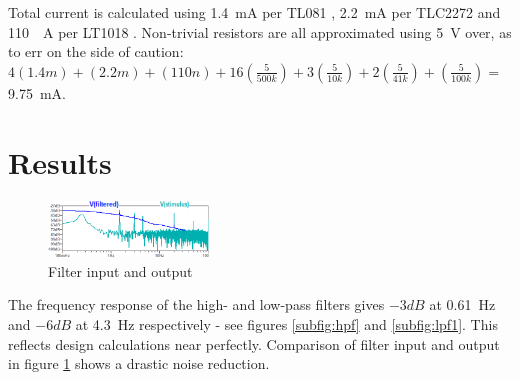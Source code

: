 Total current is calculated using \SI{1.4}{mA} per TL081 \cite{tl081}, \SI{2.2}{mA} per TLC2272 \cite{tlc2272} and \SI{110}{\mu A} per LT1018 \cite{lt1018}. Non-trivial resistors are all approximated using \SI{5}{V} over, as to err on the side of caution: $4(1.4m) + (2.2m) + (110n) + 16\left(\frac{5}{500k}\right) + 3\left(\frac{5}{10k}\right) +
 2\left(\frac{5}{41k}\right) + \left(\frac{5}{100k}\right) =$ \SI{9.75}{mA}.

\section{Results} \label{sec:heartResults}

\begin{figure}
\centering
\vspace{-.8cm}
\includegraphics[width=0.38\textwidth]{./Figures/filtout}
\caption{Filter input and output}
\label{fig:filtout}
\end{figure}

The frequency response of the high- and low-pass filters gives $-3dB$ at \SI{0.61}{Hz} and $-6dB$ at \SI{4.3}{Hz} respectively - see figures \ref{subfig:hpf} and \ref{subfig:lpf1}. This reflects design calculations near perfectly. Comparison of filter input and output in figure \ref{fig:filtout} shows a drastic noise reduction.
\pagebreak

